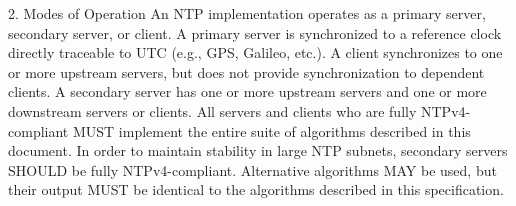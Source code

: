 2. Modes of Operation
 An NTP implementation operates as a primary server, secondary server,
 or client. A primary server is synchronized to a reference clock
 directly traceable to UTC (e.g., GPS, Galileo, etc.). A client
 synchronizes to one or more upstream servers, but does not provide
 synchronization to dependent clients. A secondary server has one or
 more upstream servers and one or more downstream servers or clients.
 All servers and clients who are fully NTPv4-compliant MUST implement
 the entire suite of algorithms described in this document. In order
 to maintain stability in large NTP subnets, secondary servers SHOULD
 be fully NTPv4-compliant. Alternative algorithms MAY be used, but
 their output MUST be identical to the algorithms described in this
 specification.
